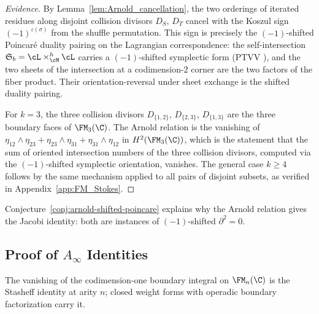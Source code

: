 \begin{proof}[Evidence]
By Lemma~\ref{lem:Arnold_cancellation}, the two orderings of iterated residues along disjoint collision divisors $D_S$, $D_T$ cancel with the Koszul sign $(-1)^{\varepsilon(\sigma)}$ from the shuffle permutation. This sign is precisely the $(-1)$-shifted Poincar\'{e} duality pairing on the Lagrangian correspondence: the self-intersection $\mathfrak{S}_b = \cL \times_{\cM}^h \cL$ carries a $(-1)$-shifted symplectic form (PTVV \cite{PTVV13}), and the two sheets of the intersection at a codimension-$2$ corner are the two factors of the fiber product. Their orientation-reversal under sheet exchange is the shifted duality pairing.

For $k=3$, the three collision divisors $D_{\{1,2\}}$, $D_{\{2,3\}}$, $D_{\{1,3\}}$ are the three boundary faces of $\FM_3(\C)$. The Arnold relation is the vanishing of $\eta_{12}\wedge\eta_{23} + \eta_{23}\wedge\eta_{31} + \eta_{31}\wedge\eta_{12}$ in $H^2(\FM_3(\C))$, which is the statement that the sum of oriented intersection numbers of the three collision divisors, computed via the $(-1)$-shifted symplectic orientation, vanishes. The general case $k \geq 4$ follows by the same mechanism applied to all pairs of disjoint subsets, as verified in Appendix~\ref{app:FM_Stokes}.
\end{proof}

\begin{remark}
\label{rem:corner-poincare}
Conjecture~\ref{conj:arnold-shifted-poincare} explains why the Arnold relation gives the Jacobi identity: both are instances of $(-1)$-shifted $\partial^2 = 0$.
\end{remark}

\subsection{\texorpdfstring{Proof of $A_\infty$ Identities}{Proof of A-infinity Identities}}

The vanishing of the codimension-one boundary integral on $\FM_n(\C)$ is the Stasheff identity at arity $n$; closed weight forms with operadic boundary factorization carry it.

